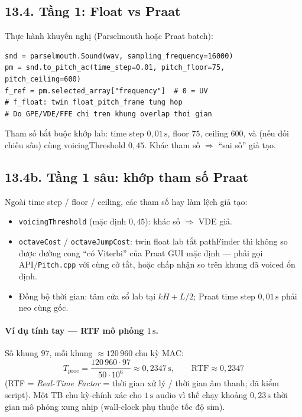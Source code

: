 \subsection*{13.4. Tầng 1: Float vs Praat}

Thực hành khuyến nghị (Parselmouth hoặc Praat batch):
\begin{verbatim}
snd = parselmouth.Sound(wav, sampling_frequency=16000)
pm = snd.to_pitch_ac(time_step=0.01, pitch_floor=75, pitch_ceiling=600)
f_ref = pm.selected_array["frequency"]  # 0 = UV
# f_float: twin float_pitch_frame tung hop
# Do GPE/VDE/FFE chi tren khung overlap thoi gian
\end{verbatim}
Tham số bắt buộc khớp lab: time step $0{,}01\,\text{s}$, floor $75$, ceiling $600$, và (nếu đối chiếu sâu) cùng voicingThreshold $0{,}45$. Khác tham số $\Rightarrow$ ``sai số'' giả tạo.

\subsection*{13.4b. Tầng 1 sâu: khớp tham số Praat}

Ngoài time step / floor / ceiling, các tham số hay làm lệch giả tạo:
\begin{itemize}[leftmargin=1.4em]
  \item \texttt{voicingThreshold} (mặc định $0{,}45$): khác số $\Rightarrow$ VDE giả.
  \item \texttt{octaveCost} / \texttt{octaveJumpCost}: twin float lab tắt pathFinder thì không so được đường cong ``có Viterbi'' của Praat GUI mặc định --- phải gọi API/\texttt{Pitch.cpp} với cùng cờ tắt, hoặc chấp nhận so trên khung đã voiced ổn định.
  \item Đồng bộ thời gian: tâm cửa sổ lab tại $kH+L/2$; Praat time step $0{,}01\,\text{s}$ phải neo cùng gốc.
\end{itemize}

\paragraph{Ví dụ tính tay --- RTF mô phỏng $1\,\text{s}$.}
Số khung $97$, mỗi khung $\approx 120\,960$ chu kỳ MAC:
\[
T_{\mathrm{proc}}=\frac{120\,960\cdot 97}{50\cdot 10^6}\approx 0{,}2347\,\text{s},
\qquad \mathrm{RTF}\approx 0{,}2347
\]
(RTF = \emph{Real-Time Factor} = thời gian xử lý / thời gian âm thanh; đã kiểm script). Một TB chu kỳ-chính xác cho $1\,\text{s}$ audio vì thế chạy khoảng $0{,}23\,\text{s}$ thời gian mô phỏng xung nhịp (wall-clock phụ thuộc tốc độ sim).

